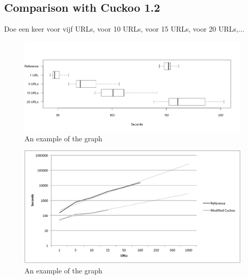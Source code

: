 \restoregeometry
\subsection{Comparison with Cuckoo 1.2}

Doe een keer voor vijf URLs, voor 10 URLs, voor 15 URLs, voor 20 URLs,...


\begin{figure}[h]
    \centering
    \centerline{\includegraphics[width=20cm]{Images/chart-box.png}}
    \caption{An example of the graph}
    \label{fig:graph}
\end{figure}

\begin{figure}[h]
    \centering
    \centerline{\includegraphics[width=20cm]{Images/chart-trend}}
    \caption{An example of the graph}
    \label{fig:graph}
\end{figure}
